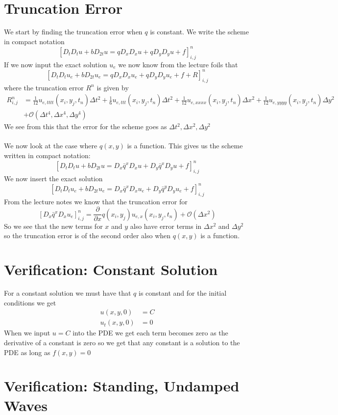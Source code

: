 \documentclass[12pt, norsk, a4paper]{article}
\begin{document}
\section*{Truncation Error}
We start by finding the truncation error when $q$ is constant.
We write the scheme in compact notation
\[\left[D_tD_tu + b D_{2t}u = qD_xD_xu + qD_yD_yu + f\right]_{i,j}^n\]
If we now input the exact solution $u_e$ we now know from the lecture foils that 
\[\left[D_tD_tu_e + bD_{2t}u_e = qD_xD_xu_e+qD_yD_yu_e + f + R\right]_{i,j}^n\]
where the truncation error $R^n$ is given by
\begin{align*}
R_{i,j}^n &= \frac{1}{12}u_{e,tttt}(x_i,y_j,t_n) \Delta t^2 +
\frac{1}{6}u_{e,ttt}(x_i,y_j,t_n)\Delta t^2 +
\frac{1}{12}u_{e,xxxx}(x_i,y_j,t_n)\Delta x^2 +
\frac{1}{12}u_{e,yyyy}(x_i,y_j,t_n)\Delta y^2 \\ 
& + \mathcal{O}(\Delta t^4, \Delta x^4, \Delta y^4)
\end{align*}
We see from this that the error for the scheme goes as $\Delta t^2, \Delta x^2,
   \Delta y^2$ \\ \\
We now look at the case where $q(x,y)$ is a function.
This gives us the scheme written in compact notation:
\[\left[D_tD_tu + b D_{2t}u = D_x\bar{q}^{x}D_xu + D_y\bar{q}^xD_yu + f\right]_{i,j}^n\]
We now insert the exact solution
\[\left[D_tD_tu_e + b D_{2t}u_e = D_x\bar{q}^{x}D_xu_e + D_y\bar{q}^yD_yu_e + f\right]_{i,j}^n\]
From the lecture notes we know that the truncation error for
\[\left[D_x\bar{q}^xD_xu_e\right]_{i,j}^n = \frac{\partial}{\partial x}
q(x_i,y_j)u_{e,x}(x_i,y_j,t_n) + \mathcal{O}(\Delta x^2)\]
So we see that the new terms for $x$ and $y$ also have error terms  in $\Delta
x^2$ and $\Delta y^2$ so the truncation error is of the second order also when
$q(x,y)$ is a function.
\section*{Verification: Constant Solution}
For a constant solution we must have that $q$ is constant and for the initial conditions we get
\begin{align*}
u(x,y,0) &= C \\
u_t(x,y,0) &= 0
\end{align*}
When we input $u=C$ into the PDE we get each term becomes zero as the derivative of a constant is zero so we get that any constant is a solution to the PDE as long as $f(x,y)=0$
\section*{Verification: Standing, Undamped Waves}
\end{document}
